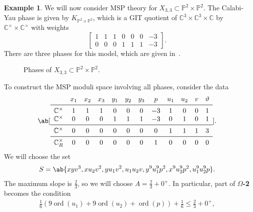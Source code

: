 \documentclass[10pt,oldfontcommands,oneside]{memoir}
\theoremstyle{definition}
\newtheorem{exm}[thm]{Example}
\theoremstyle{remark}
\theoremstyle{plain}
\theoremstyle{definition}
\theoremstyle{remark}
\newcommand{\C}{\mathbb{C}}
\renewcommand{\P}{\mathbb{P}}
\newcommand{\mc}[1]{\mathcal{#1}}
\newcommand{\on}[1]{\operatorname{#1}}
\newcommand{\1}{\mathbf{1}}
\newcommand{\2}{\mathbf{2}}
\newcommand{\3}{\mathbf{3}}
\begin{document}
\begin{exm}
    We will now consider MSP theory for $X_{3,3} \subset \P^2 \times \P^2$. The Calabi-Yau phase is given by $K_{\P^2 \times \P^2}$, which is a GIT quotient of $\C^3 \times \C^3 \times \C$ by $\C^{\times}\times \C^{\times}$ with weights
    \[ \begin{bmatrix}
        1 & 1 & 1 & 0 & 0 & 0 & -3 \\
        0 & 0 & 0 & 1 & 1 & 1 & -3
    \end{bmatrix}. \]
    There are three phases for this model, which are given in~.
    \begin{figure}[htpb]
    \begin{center}
    \end{center}
    \caption{Phases of $X_{3,3} \subset \P^2 \times \P^2$.}%
    \label{fig:p2p2}
    \end{figure}
    To construct the MSP moduli space involving all phases, consider the data 
    \[ \ab[\begin{array}{cccccccccccc}
        & x_1 & x_2 & x_3 & y_1 & y_2 & y_3 & p & u_1 & u_2 & v & \vartheta \\
        \midrule
        \C^{\times} & 1 & 1 & 1 & 0 & 0 & 0 & -3 & 1 & 0 & 0 & 1 \\
        \C^{\times} & 0 & 0 & 0 & 1 & 1 & 1 & -3 & 0 & 1 & 0 & 1 \\
        \midrule
        \C^{\times} & 0 & 0 & 0 & 0 & 0 & 0 & 0 & 1 & 1 & 1 & 3 \\
        \midrule
        \C^{\times}_R & 0 & 0 & 0 & 0 & 0 & 0 & 1 & 0 & 0 & 0 & 0
    \end{array}]. \]
    We will choose the set
    \[ S = \ab\{ xyv^3, xu_2 v^2, yu_1 v^2, u_1u_2 v, y^9 u_1^9 p^2, x^9 u_2^9 p^2, u_1^9 u_2^9 p\}. \]
    The maximum slope is $\frac{2}{3}$, so we will choose $A = \frac{2}{3} + 0^+$. In particular, part of \textbf{$\Omega$-2} becomes the condition
    \begin{align*}
        \frac{1}{6} (9 \on{ord}(u_1) + 9 \on{ord}(u_2) + \on{ord}(p)) + \frac{1}{6} \leq \frac{2}{3} + 0^+,

\end{align*}
\end{exm}
\end{document}
